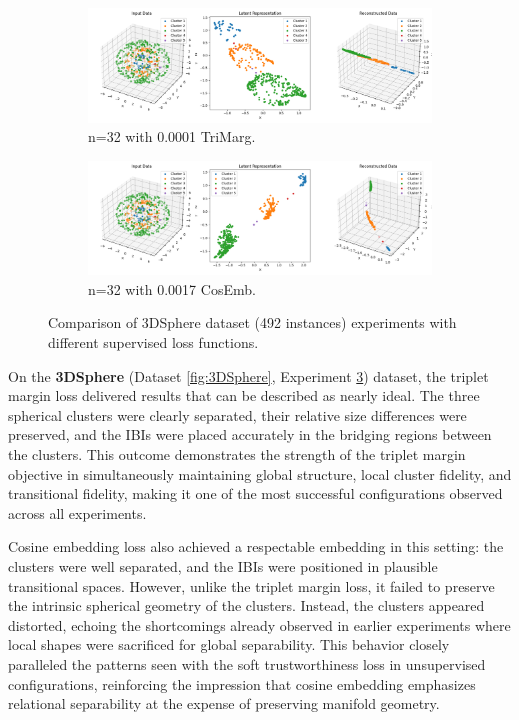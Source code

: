 \begin{figure}[htbp]
  \centering
  \begin{subfigure}[b]{1.0\textwidth}
    \centering
    \includegraphics[width=\linewidth]{images/RQ3/tri/3DSphere_32_0.0001.png}
    \caption{n=32 with 0.0001 TriMarg.}
    \label{fig:RQ3/tri/3DSphere}
  \end{subfigure}
  \hfill
  \begin{subfigure}[b]{1.0\textwidth}
    \centering
    \includegraphics[width=\linewidth]{images/RQ3/cos/3DSphere_32_0.0017.png}
    \caption{n=32 with 0.0017 CosEmb.}
    \label{fig:RQ3/cos/3DSphere}
  \end{subfigure} 

  \caption{Comparison of 3DSphere dataset (492 instances) experiments with different
supervised loss functions.}
  \label{fig:RQ3/3DSphere}
\end{figure}

On the \textbf{3DSphere} (Dataset \ref{fig:3DSphere}, Experiment \ref{fig:RQ3/3DSphere}) dataset, the triplet margin loss delivered results that can be described as nearly ideal. The three spherical clusters were clearly separated, their relative size differences were preserved, and the IBIs were placed accurately in the bridging regions between the clusters. This outcome demonstrates the strength of the triplet margin objective in simultaneously maintaining global structure, local cluster fidelity, and transitional fidelity, making it one of the most successful configurations observed across all experiments.

Cosine embedding loss also achieved a respectable embedding in this setting: the clusters were well separated, and the IBIs were positioned in plausible transitional spaces. However, unlike the triplet margin loss, it failed to preserve the intrinsic spherical geometry of the clusters. Instead, the clusters appeared distorted, echoing the shortcomings already observed in earlier experiments where local shapes were sacrificed for global separability. This behavior closely paralleled the patterns seen with the soft trustworthiness loss in unsupervised configurations, reinforcing the impression that cosine embedding emphasizes relational separability at the expense of preserving manifold geometry.
\newline

